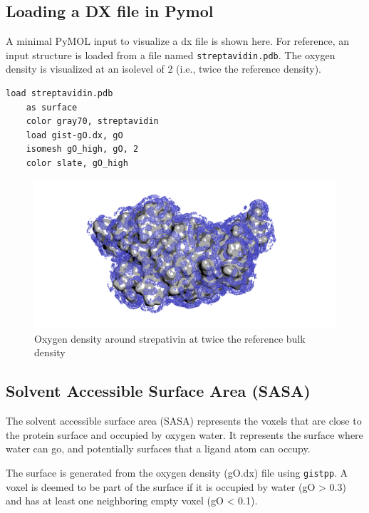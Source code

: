 \documentclass[9pt,tutorial]{livecoms}
\newcommand{\software}{\texttt}
\newcommand\inlinecode{\texttt}
\begin{document}
\subsection{Loading a DX file in Pymol }
A minimal PyMOL input to visualize a dx file is shown here.
For reference, an input structure is loaded from a file named \inlinecode{streptavidin.pdb}.
The oxygen density is visualized at an isolevel of 2 (i.e., twice the reference density).

\begin{lstlisting}[style=pymol]
	load streptavidin.pdb
	as surface
	color gray70, streptavidin
	load gist-gO.dx, gO
	isomesh gO_high, gO, 2
	color slate, gO_high
\end{lstlisting}

\begin{figure}
	\centering
	\includegraphics[width=1.0\linewidth]{figures/streptavidin_gO_high_surf.png}
	\caption{Oxygen density around strepativin at twice the reference bulk density}\label{streptavidin_gO}
\end{figure}

\subsection{Solvent Accessible Surface Area (SASA)}

The solvent accessible surface area (SASA) represents  the voxels that are close to the protein surface and occupied by oxygen water.
It represents the surface where water can go, and potentially surfaces that a ligand atom can occupy.


The surface is generated from the oxygen density (gO.dx) file using \software{gistpp}. 
A voxel is deemed to be  part of the surface if it is occupied by water (gO > 0.3) and has at least one neighboring empty voxel (gO < 0.1).
\end{document}
